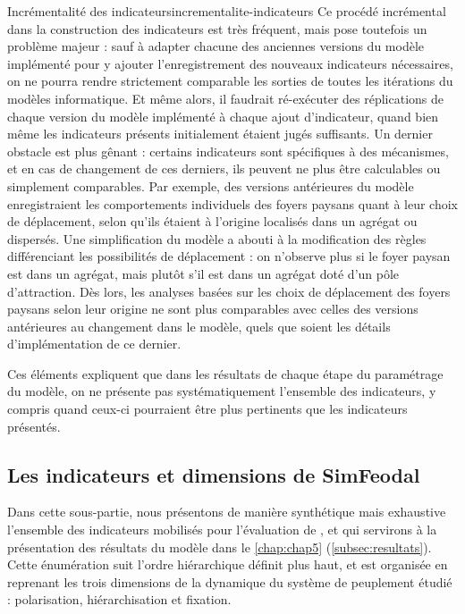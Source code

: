 \begin{encadre}{Incrémentalité des indicateurs}{incrementalite-indicateurs}
Ce procédé incrémental dans la construction des indicateurs est très fréquent, mais pose toutefois un problème majeur :
sauf à adapter chacune des anciennes versions du modèle implémenté pour y ajouter l'enregistrement des nouveaux indicateurs nécessaires, on ne pourra rendre strictement comparable les sorties de toutes les itérations du modèles informatique.
Et même alors, il faudrait ré-exécuter des réplications de chaque version du modèle implémenté à chaque ajout d'indicateur, quand bien même les indicateurs présents initialement étaient jugés suffisants.
Un dernier obstacle est plus gênant :
certains indicateurs sont spécifiques à des mécanismes, et en cas de changement de ces derniers, ils peuvent ne plus être calculables ou simplement comparables.
Par exemple, des versions antérieures du modèle enregistraient les comportements individuels des foyers paysans quant à leur \og choix\fg{} de déplacement, selon qu'ils étaient à l'origine localisés dans un agrégat ou dispersés.
Une simplification du modèle a abouti à la modification des règles différenciant les possibilités de déplacement :
on n'observe plus si le foyer paysan est dans un agrégat, mais plutôt s'il est dans un agrégat doté d'un pôle d'attraction.
Dès lors, les analyses basées sur les choix de déplacement des foyers paysans selon leur origine ne sont plus comparables avec celles des versions antérieures au changement dans le modèle, quels que soient les détails d'implémentation de ce dernier.

Ces éléments expliquent que dans les résultats de chaque étape du paramétrage du modèle, on ne présente pas systématiquement l'ensemble des indicateurs, y compris quand ceux-ci pourraient être plus pertinents que les indicateurs présentés.
\end{encadre}

\clearpage
\subsection{Les indicateurs et dimensions de SimFeodal \label{subsec:indicateurs-simfeodal}}

Dans cette sous-partie, nous présentons de manière synthétique mais exhaustive l'ensemble des indicateurs mobilisés pour l'évaluation de \simfeodal{}, et qui servirons à la présentation des résultats du modèle dans le \cref{chap:chap5} (\cref{subsec:resultats}).
Cette énumération suit l'ordre hiérarchique définit plus haut, et est organisée en reprenant les trois dimensions de la dynamique du système de peuplement étudié : polarisation, hiérarchisation et fixation.

